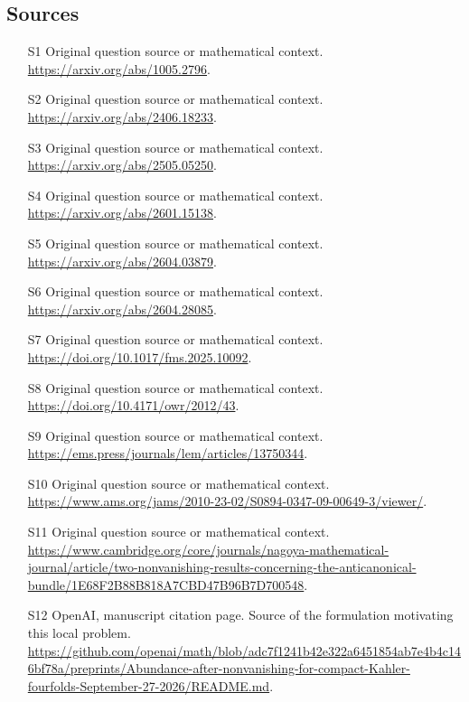 \documentclass[11pt]{article}
\begin{document}
\subsection{Sources}
\begin{itemize}
\item[S1] Original question source or mathematical context.
\url{https://arxiv.org/abs/1005.2796}.
\item[S2] Original question source or mathematical context.
\url{https://arxiv.org/abs/2406.18233}.
\item[S3] Original question source or mathematical context.
\url{https://arxiv.org/abs/2505.05250}.
\item[S4] Original question source or mathematical context.
\url{https://arxiv.org/abs/2601.15138}.
\item[S5] Original question source or mathematical context.
\url{https://arxiv.org/abs/2604.03879}.
\item[S6] Original question source or mathematical context.
\url{https://arxiv.org/abs/2604.28085}.
\item[S7] Original question source or mathematical context.
\url{https://doi.org/10.1017/fms.2025.10092}.
\item[S8] Original question source or mathematical context.
\url{https://doi.org/10.4171/owr/2012/43}.
\item[S9] Original question source or mathematical context.
\url{https://ems.press/journals/lem/articles/13750344}.
\item[S10] Original question source or mathematical context.
\url{https://www.ams.org/jams/2010-23-02/S0894-0347-09-00649-3/viewer/}.
\item[S11] Original question source or mathematical context.
\url{https://www.cambridge.org/core/journals/nagoya-mathematical-journal/article/two-nonvanishing-results-concerning-the-anticanonical-bundle/1E68F2B88B818A7CBD47B96B7D700548}.
\item[S12] OpenAI, manuscript citation page. Source of the formulation motivating this local problem.
\url{https://github.com/openai/math/blob/adc7f1241b42e322a6451854ab7e4b4c146bf78a/preprints/Abundance-after-nonvanishing-for-compact-Kahler-fourfolds-September-27-2026/README.md}.
\end{itemize}
\end{document}

